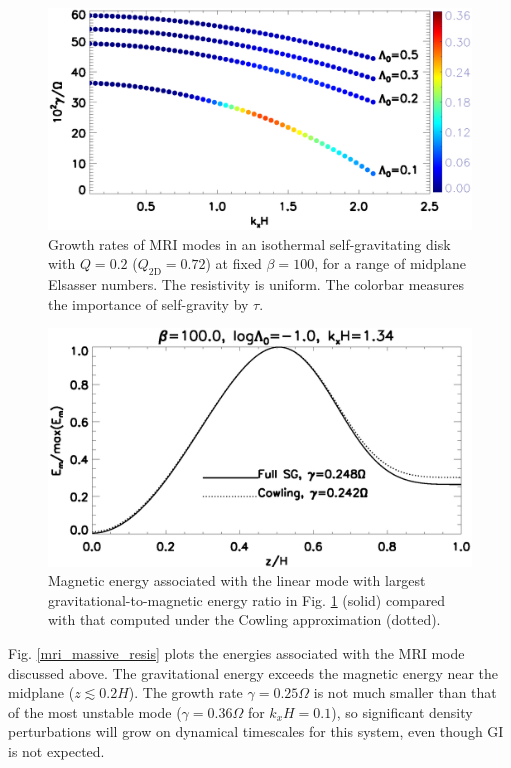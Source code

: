 \begin{figure}
  \includegraphics[width=\linewidth]{figures/compare_energy_resis}
  \caption{
    Growth rates of MRI modes in an isothermal self-gravitating
    disk with $Q=0.2$ ($Q_\mathrm{2D}=0.72$) at fixed $\beta=100$, 
    for a range of midplane Elsasser numbers. The resistivity is
    uniform. The colorbar measures the importance of self-gravity by $\tau$. 
    \label{gravity_energy_resis}}
\end{figure}


\begin{figure}
  \includegraphics[width=\linewidth]{figures/compare_result_cowling}
  \caption{Magnetic energy associated with the linear mode with
    largest gravitational-to-magnetic energy ratio in 
    Fig. \ref{gravity_energy_resis} (solid) compared with that computed
    under the Cowling approximation (dotted). %
    \label{mri_massive_cowling}}
\end{figure}

Fig. \ref{mri_massive_resis} plots the energies associated with the 
MRI mode discussed above. 
The gravitational energy exceeds the 
magnetic energy near the midplane ($z\lesssim0.2H$). The growth rate
$\gamma=0.25\Omega$ is not much smaller than that of the most unstable
mode ($\gamma=0.36\Omega$ for $k_xH=0.1$), so significant density
perturbations will grow on dynamical timescales for this
system, even though GI is not expected.

